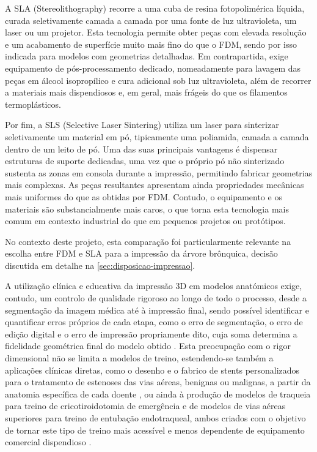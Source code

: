 A SLA (Stereolithography) recorre a uma cuba de resina fotopolimérica líquida, curada seletivamente camada a camada por uma fonte de luz ultravioleta, um laser ou um projetor. Esta tecnologia permite obter peças com elevada resolução e um acabamento de superfície muito mais fino do que o FDM, sendo por isso indicada para modelos com geometrias detalhadas. Em contrapartida, exige equipamento de pós-processamento dedicado, nomeadamente para lavagem das peças em álcool isopropílico e cura adicional sob luz ultravioleta, além de recorrer a materiais mais dispendiosos e, em geral, mais frágeis do que os filamentos termoplásticos.

Por fim, a SLS (Selective Laser Sintering) utiliza um laser para sinterizar seletivamente um material em pó, tipicamente uma poliamida, camada a camada dentro de um leito de pó. Uma das suas principais vantagens é dispensar estruturas de suporte dedicadas, uma vez que o próprio pó não sinterizado sustenta as zonas em consola durante a impressão, permitindo fabricar geometrias mais complexas. As peças resultantes apresentam ainda propriedades mecânicas mais uniformes do que as obtidas por FDM. Contudo, o equipamento e os materiais são substancialmente mais caros, o que torna esta tecnologia mais comum em contexto industrial do que em pequenos projetos ou protótipos.

No contexto deste projeto, esta comparação foi particularmente relevante na escolha entre FDM e SLA para a impressão da árvore brônquica, decisão discutida em detalhe na \cref{sec:disposicao-impressao}.

A utilização clínica e educativa da impressão 3D em modelos anatómicos exige, contudo, um controlo de qualidade rigoroso ao longo de todo o processo, desde a segmentação da imagem médica até à impressão final, sendo possível identificar e quantificar erros próprios de cada etapa, como o erro de segmentação, o erro de edição digital e o erro de impressão propriamente dito, cuja soma determina a fidelidade geométrica final do modelo obtido \parencite{Schulze2024}. Esta preocupação com o rigor dimensional não se limita a modelos de treino, estendendo-se também a aplicações clínicas diretas, como o desenho e o fabrico de stents personalizados para o tratamento de estenoses das vias aéreas, benignas ou malignas, a partir da anatomia específica de cada doente \parencite{Aravena2023,Yilmaz2022,Shan2019}, ou ainda à produção de modelos de traqueia para treino de cricotiroidotomia de emergência e de modelos de vias aéreas superiores para treino de entubação endotraqueal, ambos criados com o objetivo de tornar este tipo de treino mais acessível e menos dependente de equipamento comercial dispendioso \parencite{Doucet2017,Park2023}.

